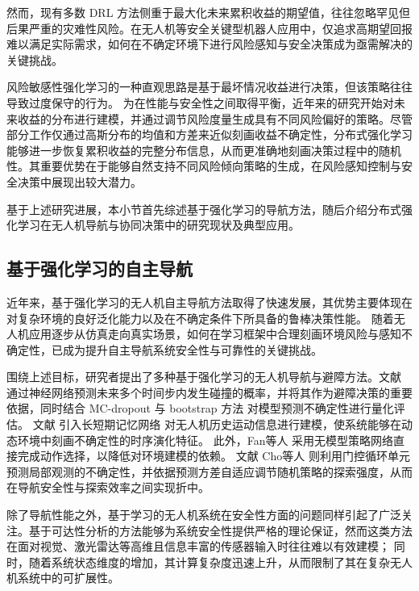 然而，现有多数 DRL 方法侧重于最大化未来累积收益的期望值，往往忽略罕见但后果严重的灾难性风险。在无人机等安全关键型机器人应用中，仅追求高期望回报难以满足实际需求，如何在不确定环境下进行风险感知与安全决策成为亟需解决的关键挑战。

风险敏感性强化学习的一种直观思路是基于最坏情况收益进行决策，但该策略往往导致过度保守的行为\cite{noorani2025risk}。
为在性能与安全性之间取得平衡，近年来的研究开始对未来收益的分布进行建模，并通过调节风险度量生成具有不同风险偏好的策略\cite{bellemare2023distributional}。尽管部分工作仅通过高斯分布的均值和方差来近似刻画收益不确定性，分布式强化学习能够进一步恢复累积收益的完整分布信息\cite{luis2024value}，从而更准确地刻画决策过程中的随机性。其重要优势在于能够自然支持不同风险倾向策略的生成，在风险感知控制与安全决策中展现出较大潜力\cite{urpi2021risk, ma2020distributional}。

基于上述研究进展，本小节首先综述基于强化学习的导航方法，随后介绍分布式强化学习在无人机导航与协同决策中的研究现状及典型应用。
\subsection{基于强化学习的自主导航}

近年来，基于强化学习的无人机自主导航方法取得了快速发展，其优势主要体现在对复杂环境的良好泛化能力以及在不确定条件下所具备的鲁棒决策性能。
随着无人机应用逐步从仿真走向真实场景，如何在学习框架中合理刻画环境风险与感知不确定性，已成为提升自主导航系统安全性与可靠性的关键挑战。

围绕上述目标，研究者提出了多种基于强化学习的无人机导航与避障方法。文献 通过神经网络预测未来多个时间步内发生碰撞的概率，并将其作为避障决策的重要依据，同时结合 MC-dropout\cite{folgoc2021mc} 与 bootstrap 方法\cite{peer2021ensemble} 对模型预测不确定性进行量化评估。
文献  引入长短期记忆网络\cite{krichen2025long} 对无人机历史运动信息进行建模，使系统能够在动态环境中刻画不确定性的时序演化特征。
此外，Fan等人 \cite{fan2020learning} 采用无模型策略网络直接完成动作选择，以降低对环境建模的依赖。
文献 Cho等人\cite{cho2014properties} 则利用门控循环单元预测局部观测的不确定性，并依据预测方差自适应调节随机策略的探索强度，从而在导航安全性与探索效率之间实现折中。

除了导航性能之外，基于学习的无人机系统在安全性方面的问题同样引起了广泛关注。基于可达性分析的方法能够为系统安全性提供严格的理论保证，然而这类方法在面对视觉、激光雷达等高维且信息丰富的传感器输入时往往难以有效建模；
同时，随着系统状态维度的增加，其计算复杂度迅速上升，从而限制了其在复杂无人机系统中的可扩展性\cite{gu2024review,brunke2022safe,yu2022towards}。

